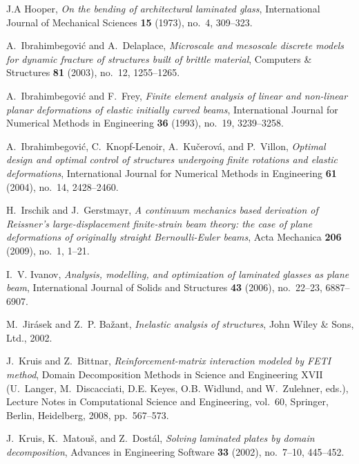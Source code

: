 \documentclass[11pt]{article}
\begin{document}
\begin{thebibliography}{10}
J.A Hooper, \emph{On the bending of architectural laminated glass},
  International Journal of Mechanical Sciences \textbf{15} (1973), no.~4,
  309--323.

A.~Ibrahimbegovi\'{c} and A.~Delaplace, \emph{Microscale and mesoscale discrete
  models for dynamic fracture of structures built of brittle material},
  Computers \& Structures \textbf{81} (2003), no.~12, 1255--1265.

A.~Ibrahimbegovi\'{c} and F.~Frey, \emph{Finite element analysis of linear and
  non-linear planar deformations of elastic initially curved beams},
  International Journal for Numerical Methods in Engineering \textbf{36}
  (1993), no.~19, 3239--3258.

A.~Ibrahimbegovi\'c, C.~Knopf-Lenoir, A.~Ku\v{c}erov\'a, and P.~Villon,
  \emph{Optimal design and optimal control of structures undergoing finite
  rotations and elastic deformations}, International Journal for Numerical
  Methods in Engineering \textbf{61} (2004), no.~14, 2428--2460.

H.~Irschik and J.~Gerstmayr, \emph{A continuum mechanics based derivation of
  {R}eissner's large-displacement finite-strain beam theory: the case of plane
  deformations of originally straight {B}ernoulli-{E}uler beams}, Acta
  Mechanica \textbf{206} (2009), no.~1, 1--21.

I.~V. Ivanov, \emph{Analysis, modelling, and optimization of laminated glasses
  as plane beam}, International Journal of Solids and Structures \textbf{43}
  (2006), no.~22--23, 6887--6907.

M.~Jir\'{a}sek and Z.~P. Ba\v{z}ant, \emph{Inelastic analysis of structures},
  John Wiley \& Sons, Ltd., 2002.

J.~Kruis and Z.~Bittnar, \emph{Reinforcement-matrix interaction modeled by
  {FETI} method}, Domain Decomposition Methods in Science and Engineering XVII
  (U.~Langer, M.~Discacciati, D.E. Keyes, O.B. Widlund, and W.~Zulehner, eds.),
  Lecture Notes in Computational Science and Engineering, vol.~60, Springer,
  Berlin, Heidelberg, 2008, pp.~567--573.

J.~Kruis, K.~Matou\v{s}, and Z.~Dost\'{a}l, \emph{Solving laminated plates by
  domain decomposition}, Advances in Engineering Software \textbf{33} (2002),
  no.~7--10, 445--452.


\end{thebibliography}
\end{document}

